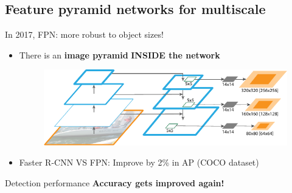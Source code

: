 \documentclass{beamer}[10pt, usepdftitle=false, handout]
\begin{document}
	\subsection{Feature pyramid networks for multiscale}    
    \begin{frame}
    
	In 2017, FPN: more robust to object sizes!
	
	\vspace*{1em}    
    
	\begin{itemize}
		\item{There is an \textbf{image pyramid} \textbf{INSIDE the network}
			\begin{figure}
				\includegraphics[scale=0.7]{36.png} 
			\end{figure}
		}
		\item{Faster R-CNN VS FPN: Improve by 2\% in AP (COCO dataset)}
	
	\end{itemize}	    
	\vspace*{1em}    	 	
    	
    \begin{block}{Detection performance} 	
	\textbf{Accuracy gets improved again!}    	 
	\end{block}	
    	 	
    \end{frame}	    
	        
\end{document}
